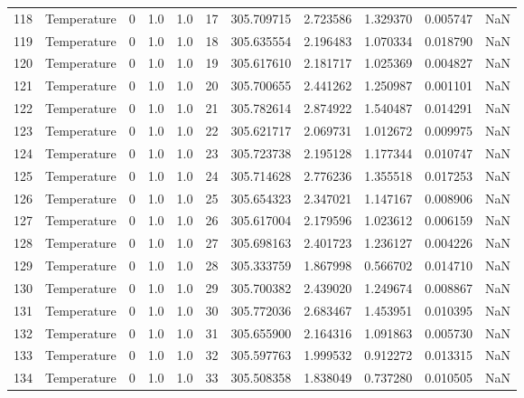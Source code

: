 \begin{tabular}{llrrrrrrrrr}
118 &  Temperature &       0 &  1.0 &  1.0 &   17 &  305.709715 &  2.723586 &  1.329370 &   0.005747 &      NaN \\
119 &  Temperature &       0 &  1.0 &  1.0 &   18 &  305.635554 &  2.196483 &  1.070334 &   0.018790 &      NaN \\
120 &  Temperature &       0 &  1.0 &  1.0 &   19 &  305.617610 &  2.181717 &  1.025369 &   0.004827 &      NaN \\
121 &  Temperature &       0 &  1.0 &  1.0 &   20 &  305.700655 &  2.441262 &  1.250987 &   0.001101 &      NaN \\
122 &  Temperature &       0 &  1.0 &  1.0 &   21 &  305.782614 &  2.874922 &  1.540487 &   0.014291 &      NaN \\
123 &  Temperature &       0 &  1.0 &  1.0 &   22 &  305.621717 &  2.069731 &  1.012672 &   0.009975 &      NaN \\
124 &  Temperature &       0 &  1.0 &  1.0 &   23 &  305.723738 &  2.195128 &  1.177344 &   0.010747 &      NaN \\
125 &  Temperature &       0 &  1.0 &  1.0 &   24 &  305.714628 &  2.776236 &  1.355518 &   0.017253 &      NaN \\
126 &  Temperature &       0 &  1.0 &  1.0 &   25 &  305.654323 &  2.347021 &  1.147167 &   0.008906 &      NaN \\
127 &  Temperature &       0 &  1.0 &  1.0 &   26 &  305.617004 &  2.179596 &  1.023612 &   0.006159 &      NaN \\
128 &  Temperature &       0 &  1.0 &  1.0 &   27 &  305.698163 &  2.401723 &  1.236127 &   0.004226 &      NaN \\
129 &  Temperature &       0 &  1.0 &  1.0 &   28 &  305.333759 &  1.867998 &  0.566702 &   0.014710 &      NaN \\
130 &  Temperature &       0 &  1.0 &  1.0 &   29 &  305.700382 &  2.439020 &  1.249674 &   0.008867 &      NaN \\
131 &  Temperature &       0 &  1.0 &  1.0 &   30 &  305.772036 &  2.683467 &  1.453951 &   0.010395 &      NaN \\
132 &  Temperature &       0 &  1.0 &  1.0 &   31 &  305.655900 &  2.164316 &  1.091863 &   0.005730 &      NaN \\
133 &  Temperature &       0 &  1.0 &  1.0 &   32 &  305.597763 &  1.999532 &  0.912272 &   0.013315 &      NaN \\
134 &  Temperature &       0 &  1.0 &  1.0 &   33 &  305.508358 &  1.838049 &  0.737280 &   0.010505 &      NaN \\

\end{tabular}
